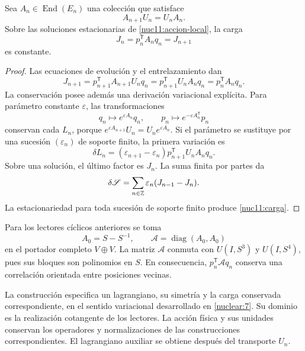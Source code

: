 \begin{proposition}
\label{nuc11:noether}
Sea \(A_n\in\operatorname{End}(E_n)\) una colección que satisface
\[
 A_{n+1}U_n=U_nA_n.
\]
Sobre las soluciones estacionarias de
\eqref{nuc11:accion-local}, la carga
\begin{equation}
 \boxed{J_n=p_n^{\mathsf T}A_nq_n=J_{n+1}}
 \label{nuc11:carga}
\end{equation}
es constante.
\end{proposition}
\begin{proof}
Las ecuaciones de evolución y el entrelazamiento dan
\[
 J_{n+1}
 =p_{n+1}^{\mathsf T}A_{n+1}U_nq_n
 =p_{n+1}^{\mathsf T}U_nA_nq_n
 =p_n^{\mathsf T}A_nq_n.
\]
La conservación posee además una derivación variacional explícita.
Para parámetro constante \(\varepsilon\), las transformaciones
\[
 q_n\mapsto e^{\varepsilon A_n}q_n,\qquad
 p_n\mapsto e^{-\varepsilon A_n^{\mathsf T}}p_n
\]
conservan cada \(L_n\), porque
\(e^{\varepsilon A_{n+1}}U_n=U_ne^{\varepsilon A_n}\).
Si el parámetro se sustituye por una sucesión
\((\varepsilon_n)\) de soporte finito, la primera variación es
\[
 \delta L_n
 =(\varepsilon_{n+1}-\varepsilon_n)
   p_{n+1}^{\mathsf T}U_nA_nq_n.
\]
Sobre una solución, el último factor es \(J_n\).
La suma finita por partes da
\[
 \delta\mathscr S
 =\sum_{n\in\mathbb Z}\varepsilon_n(J_{n-1}-J_n).
\]
La estacionariedad para toda sucesión de soporte finito produce
\eqref{nuc11:carga}.
\end{proof}

Para los lectores cíclicos anteriores se toma
\[
 A_0=S-S^{-1},\qquad
 \mathcal A=\operatorname{diag}(A_0,A_0)
\]
en el portador completo \(V\oplus V\).
La matriz \(\mathcal A\) conmuta con \(U(I,S^3)\) y
\(U(I,S^4)\), pues sus bloques son polinomios en \(S\).
En consecuencia, \(p_n^{\mathsf T}\mathcal A q_n\) conserva
una correlación orientada entre posiciones vecinas.

La construcción especifica un lagrangiano, su simetría y la carga
conservada correspondiente, en el sentido variacional desarrollado
en \cref{nuclear:7}.
Su dominio es la realización cotangente de los lectores.
La acción física y sus unidades conservan los operadores y
normalizaciones de las construcciones correspondientes.
El lagrangiano auxiliar se obtiene después del transporte \(U_n\).
